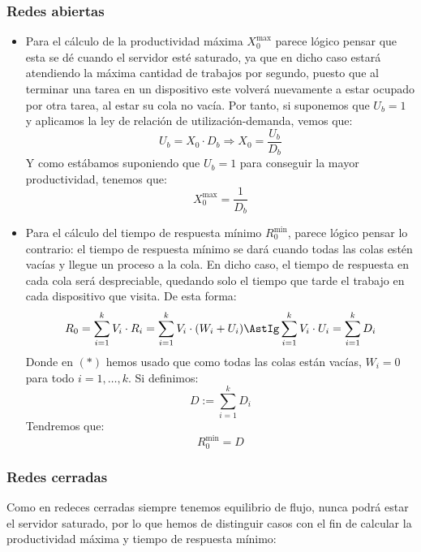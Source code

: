 \subsubsection{Redes abiertas}
\begin{itemize}
    \item Para el cálculo de la productividad máxima $X_0^{\text{max}}$ parece lógico pensar que esta se dé cuando el servidor esté saturado, ya que en dicho caso estará atendiendo la máxima cantidad de trabajos por segundo, puesto que al terminar una tarea en un dispositivo este volverá nuevamente a estar ocupado por otra tarea, al estar su cola no vacía. Por tanto, si suponemos que $U_b = 1$ y aplicamos la ley de relación de utilización-demanda, vemos que:
        \begin{equation*}
            U_b = X_0 \cdot D_b \Longrightarrow X_0 = \dfrac{U_b}{D_b}
        \end{equation*}
        Y como estábamos suponiendo que $U_b = 1$ para conseguir la mayor productividad, tenemos que:
        \begin{equation*}
            X_0^{\text{max}} = \dfrac{1}{D_b}
        \end{equation*}
    \item Para el cálculo del tiempo de respuesta mínimo $R_0^{\text{min}}$, parece lógico pensar lo contrario: el tiempo de respuesta mínimo se dará cuando todas las colas estén vacías y llegue un proceso a la cola. En dicho caso, el tiempo de respuesta en cada cola será despreciable, quedando solo el tiempo que tarde el trabajo en cada dispositivo que visita. De esta forma:
        \begin{equation*}
            R_0 = \sum_{i=1}^{k} V_i\cdot R_i = \sum_{i=1}^{k} V_i\cdot (W_i + U_i) \AstIg \sum_{i=1}^{k} V_i \cdot U_i = \sum_{i=1}^{k} D_i
        \end{equation*}
        Donde en $(\ast)$ hemos usado que como todas las colas están vacías, $W_i = 0$ para todo $i = 1,\ldots,k$. Si definimos:
        \begin{equation*}
            D := \sum_{i=1}^{k}D_i
        \end{equation*}
        Tendremos que:
        \begin{equation*}
            R_0^{\text{min}} = D
        \end{equation*}
\end{itemize}

\subsubsection{Redes cerradas}
Como en redeces cerradas siempre tenemos equilibrio de flujo, nunca podrá estar el servidor saturado, por lo que hemos de distinguir casos con el fin de calcular la productividad máxima y tiempo de respuesta mínimo:

